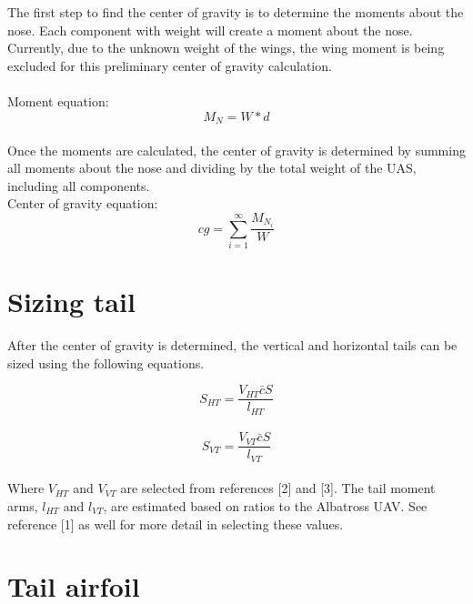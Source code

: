 \documentclass{article}
\begin{document}
The first step to find the center of gravity is to determine the moments about the nose. Each component with weight will create a moment about the nose. Currently, due to the unknown weight of the wings, the wing moment is being excluded for this preliminary center of gravity calculation.\\\\
Moment equation:\\

$$M_N = W*d$$ \\

Once the moments are calculated, the center of gravity is determined by summing all moments about the nose and dividing by the total weight of the UAS, including all components.\\

Center of gravity equation:
$$cg = \sum_{i=1}^{\infty} \frac{M_{N_i}}{W}$$


\section*{Sizing tail}

After the center of gravity is determined, the vertical and horizontal tails can be sized using the following equations.

$$S_{HT} = \frac{V_{HT}\bar{c}S}{l_{HT}}$$\\
$$S_{VT} = \frac{V_{VT}\bar{c}S}{l_{VT}}$$\\

Where $V_{HT}$ and $V_{VT}$ are selected from references [2] and [3]. The tail moment arms, $l_{HT}$ and $l_{VT}$, are estimated based on ratios to the Albatross UAV. See reference [1] as well for more detail in selecting these values. 

\section*{Tail airfoil}
\end{document}
